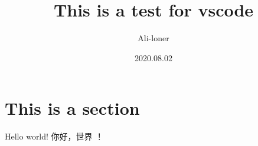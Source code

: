 \documentclass[a4paper]{article}
\title{\heiti\zihao{2} This is a test for vscode}
\author{\songti Ali-loner}
\date{2020.08.02}
\begin{document}
    \maketitle
\begin{abstract}
    \lipsum[2]
\end{abstract}
\tableofcontents
\section{This is a section}
Hello world! 你好，世界 ！
\end{document}
